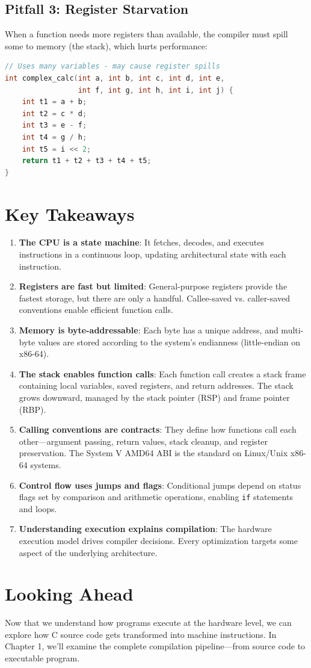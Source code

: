\subsection{Pitfall 3: Register Starvation}

When a function needs more registers than available, the compiler must spill some to memory (the stack), which hurts performance:

\begin{lstlisting}[language=C]
// Uses many variables - may cause register spills
int complex_calc(int a, int b, int c, int d, int e,
                 int f, int g, int h, int i, int j) {
    int t1 = a + b;
    int t2 = c * d;
    int t3 = e - f;
    int t4 = g / h;
    int t5 = i << 2;
    return t1 + t2 + t3 + t4 + t5;
}
\end{lstlisting}

\section{Key Takeaways}

\begin{enumerate}
  \item \textbf{The CPU is a state machine}: It fetches, decodes, and executes instructions in a continuous loop, updating architectural state with each instruction.

  \item \textbf{Registers are fast but limited}: General-purpose registers provide the fastest storage, but there are only a handful. Callee-saved vs. caller-saved conventions enable efficient function calls.

  \item \textbf{Memory is byte-addressable}: Each byte has a unique address, and multi-byte values are stored according to the system's endianness (little-endian on x86-64).

  \item \textbf{The stack enables function calls}: Each function call creates a stack frame containing local variables, saved registers, and return addresses. The stack grows downward, managed by the stack pointer (RSP) and frame pointer (RBP).

  \item \textbf{Calling conventions are contracts}: They define how functions call each other---argument passing, return values, stack cleanup, and register preservation. The System V AMD64 ABI is the standard on Linux/Unix x86-64 systems.

  \item \textbf{Control flow uses jumps and flags}: Conditional jumps depend on status flags set by comparison and arithmetic operations, enabling \texttt{if} statements and loops.

  \item \textbf{Understanding execution explains compilation}: The hardware execution model drives compiler decisions. Every optimization targets some aspect of the underlying architecture.
\end{enumerate}

\section{Looking Ahead}

Now that we understand how programs execute at the hardware level, we can explore how C source code gets transformed into machine instructions. In Chapter 1, we'll examine the complete compilation pipeline---from source code to executable program.
